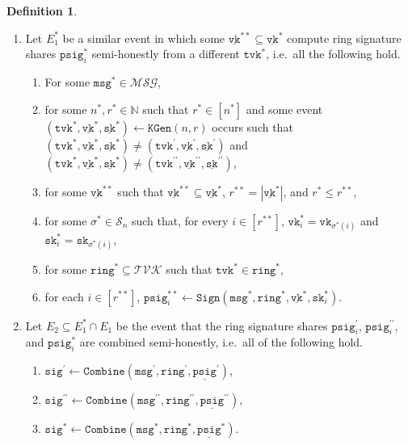 \documentclass[11pt]{article}
\theoremstyle{definition}
\newtheorem{definition}[definition]{Definition}
\newcommand{\sk}{\texttt{sk}}
\newcommand{\vk}{\texttt{vk}}
\newcommand{\tvk}{\texttt{tvk}}
\newcommand{\ring}{\texttt{ring}}
\newcommand{\SK}{\underline{\texttt{sk}}}
\newcommand{\VK}{\underline{\texttt{vk}}}
\newcommand{\sig}{\texttt{sig}}
\newcommand{\psig}{\texttt{psig}}
\newcommand{\psigs}{\underline{\texttt{psig}}}
\newcommand{\bbn}{\mathbb{N}}
\newcommand{\msg}{\texttt{msg}}
\newcommand{\keygen}{\texttt{KGen}}
\newcommand{\keygenIshort}{(n,r)}
\newcommand{\sign}{\texttt{Sign}}
\newcommand{\combine}{\texttt{Combine}}
\newcommand{\verifyshare}{\texttt{VfSh}}
\begin{document}
\begin{definition}
\begin{enumerate}
\item Let $E_1^*$ be a similar event in which some $\VK^{**} \subseteq \VK^*$ compute ring signature shares $\psig^*_i$ semi-honestly from a different $\tvk^*$, i.e.\ all the following hold.
\begin{enumerate}
\item For some $\msg^* \in \mathcal{MSG}$,
\item for some $n^*, r^* \in \bbn$ such that  $r^* \in [n^*]$ and some event $(\tvk^*, \VK^*,  \SK^*) \leftarrow \keygen\keygenIshort$ occurs such that $(\tvk^*, \VK^*,  \SK^*) \neq (\tvk^\prime, \VK^\prime,  \SK^\prime)$ and $(\tvk^*, \VK^*,  \SK^*) \neq (\tvk^{\prime\prime}, \VK^{\prime\prime},  \SK^{\prime\prime})$,
\item for some $\VK^{**}$
such that $\VK^{**} \subseteq \VK^*$, $r^{**} = \left|\VK^*\right|$, and  $r^* \leq r^{**}$,
\item for some $\sigma^* \in \mathcal{S}_n$ such that, for every $i \in [r^{**}]$, $\vk^*_i = \vk_{\sigma^*(i)}$ and  $\sk^*_i = \sk_{\sigma^*(i)}$,
\item for some $\ring^* \subseteq \mathcal{TVK}$ such that $\tvk^* \in \ring^*$,

\item for each $i \in [r^{**}]$, $\psig_i^{**} \leftarrow \sign(\msg^*, \ring^*, \VK^*,  \sk^*_i)$.
\end{enumerate}





\item Let $E_2 \subseteq E_1^* \cap E_1$ be the event that the ring signature shares $\psig_i^\prime$, $\psig_i^{\prime \prime}$, and $\psig_i^{*}$ are combined semi-honestly, i.e.\ all of the following hold.
\begin{enumerate}
\item $\sig^\prime \leftarrow \combine(\msg^\prime, \ring^\prime, \psigs^\prime)$,
\item $\sig^{\prime\prime} \leftarrow \combine(\msg^{\prime\prime}, \ring^{\prime\prime},  \psigs^{\prime\prime})$,
\item $\sig^* \leftarrow \combine(\msg^*, \ring^*, \psigs^*)$.
\end{enumerate}


\end{enumerate}
\end{definition}
\end{document}
